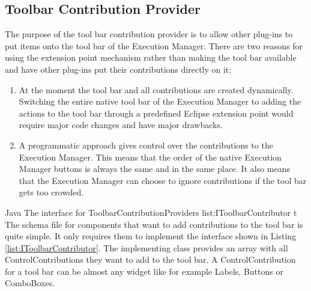 \subsection{Toolbar Contribution Provider}
\label{section:ToolbarContributionProvider}
The purpose of the tool bar contribution provider is to allow other plug-ins to put
items onto the tool bar of the Execution Manager. 
There are two reasons for using the extension point mechanism
rather than making the tool bar available and have other plug-ins put their
contributions directly on it:
\begin{enumerate}
 \item At the moment the tool bar and all contributions are created dynamically. Switching
the entire native tool bar of the Execution Manager to adding the actions to the tool bar
through a predefined Eclipse extension point would require major code changes and
have major drawbacks.
 \item A programmatic approach gives control over the contributions to the Execution Manager.
This means that the order of the native Execution Manager buttons is always the same and in the
same place. It also means that the Execution Manager can choose to ignore contributions if the
tool bar gets too crowded.
\end{enumerate}
\listingjava
{}
{Java}
{The interface for ToolbarContributionProviders}
{list:IToolbarContributor}
{t}
The schema file for components that want to add contributions to the tool bar is quite simple.
It only requires them to implement the interface shown in Listing \ref{list:IToolbarContributor}.
The implementing class provides an array with all ControlContributions they want to add to the tool bar.
A ControlContribution for a tool bar can be almost any widget like for example Labels, Buttons or ComboBoxes.

